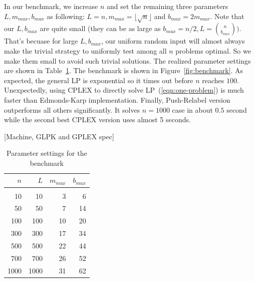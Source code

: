 \documentclass{article}
\begin{document}
In our benchmark, we increase $n$ and set the remaining three parameters $L,
m_{max}, b_{max}$ as following: $L = n, m_{max} = \lfloor \sqrt{n} \rfloor$ and
$b_{max} = 2m_{max}$. Note that our $L, b_{max}$ are quite small (they can be
as large as $b_{max} = n/2, L = \binom{n}{b_{max}})$. That's becuase for large
$L, b_{max}$, our uniform random input will almost always make the trivial
strategy to uniformly test among all $n$ problems optimal. So we make them
small to avoid such trivial solutions. The realized parameter settings are
shown in Table~\ref{tab:settings}. The benchmark is shown in
Figure~\ref{fig:benchmark}.  As expected, the general LP is exponential so it
times out before $n$ reaches $100$.  Unexpectedly, using CPLEX to directly
solve LP~(\ref{eqn:one-problem}) is much faster than Edmonds-Karp
implementation. Finally, Push-Relabel version outperforms all others
significantly. It solves $n=1000$ case in about $0.5$ second while the second
best CPLEX version uses almost 5 seconds.

[Machine, GLPK and GPLEX spec]

\begin{table}
	\caption{Parameter settings for the benchmark}\label{tab:settings}
	\begin{center}
	\begin{tabular}{ r r r r }
		$n$&$L$&$m_{max}$&$b_{max}$\\
		\hline\\
		10&	10&	3&	6 \\ 
		50&	50&	7&	14\\
		100&100&10&20\\
		300&300&17&34\\
		500&500&22&44\\
		700&700&26&52\\
		1000&1000&31&62
	\end{tabular}
	\end{center}
\end{table}
\end{document}
